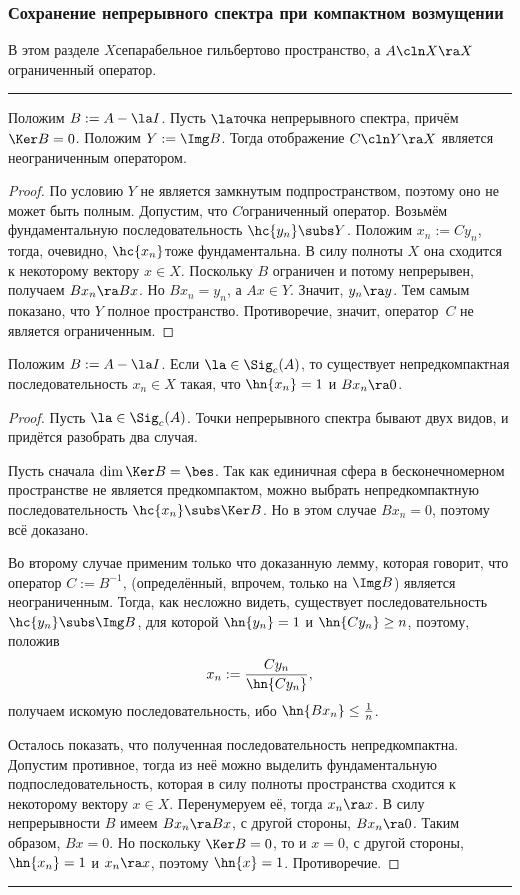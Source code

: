 \documentclass[a4paper]{article}
\newenvironment{petit}
{\par \smallskip \hrule \smallskip \footnotesize}
{\par \smallskip \hrule \smallskip}
\begin{document}
\subsubsection{Сохранение непрерывного спектра при компактном возмущении}

В этом разделе $X$\т сепарабельное гильбертово пространство, а
$A \cln X \ra X$\т ограниченный оператор.

\begin{petit}
\begin{lemma}
Положим $B := A -\la I$. Пусть $\la$\т точка непрерывного спектра, причём $\Ker B = 0$.
Положим $Y := \Img B$. Тогда отображение $C\cln Y \ra X$ является неограниченным оператором.
\end{lemma}
\begin{proof}
По условию $Y$ не является замкнутым подпространством, поэтому оно не может быть полным.
Допустим, что $C$\т ограниченный оператор. Возьмём фундаментальную последовательность $\hc{y_n} \subs Y$.
Положим ${x_n := C y_n}$, тогда, очевидно, $\hc{x_n}$\т тоже фундаментальна. В силу полноты $X$
она сходится к некоторому вектору $x \in X$. Поскольку $B$ ограничен и потому непрерывен,
получаем $Bx_n \ra Bx$. Но $B x_n = y_n$, а $Ax \in Y$. Значит, $y_n \ra y$. Тем самым показано, что $Y$
полное пространство. Противоречие, значит, оператор~$C$ не является ограниченным.
\end{proof}

\begin{lemma}
Положим $B := A - \la I$. Если $\la \in \Sig_c(A)$, то существует непредкомпактная
последовательность $x_n \in X$ такая, что $\hn{x_n} = 1$ и $B x_n \ra 0$.
\end{lemma}
\begin{proof}
Пусть $\la \in \Sig_c(A)$. Точки непрерывного спектра бывают двух видов, и придётся разобрать два случая.

Пусть сначала $\dim \Ker B = \bes$. Так как единичная сфера в бесконечномерном пространстве не
является предкомпактом, можно выбрать непредкомпактную последовательность $\hc{x_n} \subs \Ker B$.
Но в этом случае ${B x_n = 0}$, поэтому всё доказано.

Во второму случае применим только что доказанную лемму, которая говорит, что оператор $C := B^{-1}$,
(определённый, впрочем, только на $\Img B$) является неограниченным.
Тогда, как несложно видеть, существует последовательность $\hc{y_n} \subs \Img B$, для которой $\hn{y_n} = 1$ и
$\hn{C y_n} \ge n$, поэтому, положив
$$x_n := \frac{C y_n}{\hn{ Cy_n}},$$
получаем искомую последовательность, ибо
$\hn{B x_n} \le \frac{1}{n}$.

Осталось показать, что полученная последовательность непредкомпактна. Допустим противное,
тогда из неё можно выделить фундаментальную подпоследовательность, которая в силу полноты пространства
сходится к некоторому вектору $x \in X$. Перенумеруем её, тогда $x_n \ra x$.
В силу непрерывности $B$ имеем $B x_n \ra Bx$, с другой стороны, $Bx_n \ra 0$. Таким образом, $Bx = 0$.
Но поскольку $\Ker B = 0$, то и $x = 0$, с другой стороны, $\hn{x_n} = 1$ и $x_n \ra x$,
поэтому $\hn{x} = 1$. Противоречие.
\end{proof}
\end{petit}
\end{document}
